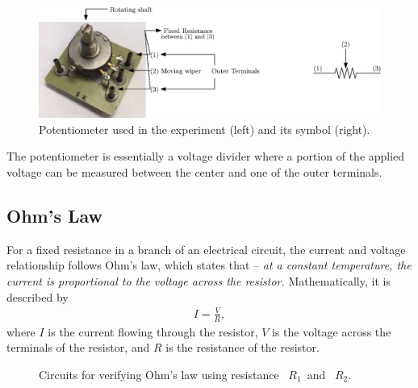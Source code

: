 
\begin{figure}[h]
    \centering
    \includegraphics[scale=0.9]{figs/ipe/lab2/potAnnotated.eps}
    \caption{Potentiometer used in the experiment (left) and its symbol (right).}
    \label{fig:potAnnotated}
\end{figure}

The potentiometer is essentially a voltage divider where a portion of the applied voltage can be measured between the center and one of the outer terminals.



\subsection{Ohm's Law}
\label{sec:OhmsLaw}
For a fixed resistance in a branch of an electrical circuit, the current and voltage relationship follows Ohm's law, which states that -- \emph{at a constant temperature,  the current is proportional to the voltage across the resistor.}  Mathematically, it is described by %
%
\begin{align}
    I= \frac{V}{R},
\end{align}
where $I$ is the current flowing through the resistor, $V$ is the voltage across the terminals of the resistor, and $R$ is the resistance of the resistor. 

\begin{figure}[h]
    \centering
    \caption{Circuits for verifying Ohm's law using resistance~ $R_1$~and~ $R_2.$}
    \label{fig:task1-Figure1}
\end{figure}


